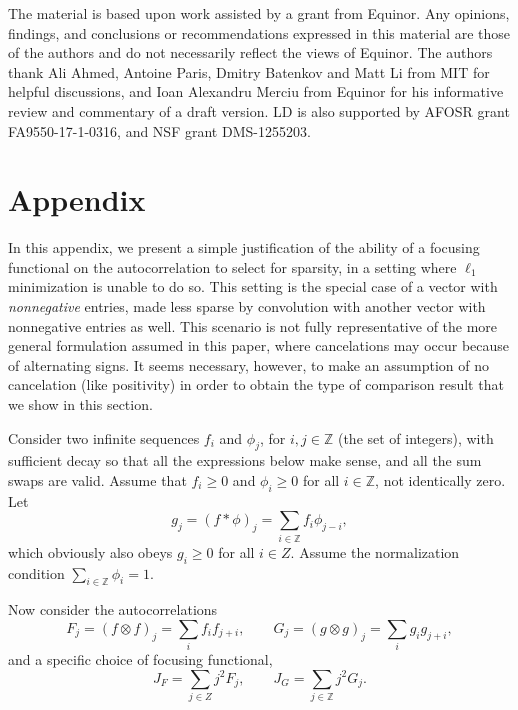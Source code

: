 \documentclass{article}
\theoremstyle{definition}
\newcommand{\Z}{\mathbb{Z}}
\begin{document}
{The material is based upon work
assisted by a grant from Equinor. 
Any opinions, findings, and conclusions or recommendations
expressed in this material 
are those of the authors
and do not necessarily 
reflect the views of Equinor.
%
The authors thank 
Ali Ahmed, Antoine Paris, Dmitry Batenkov and Matt Li from MIT for helpful discussions, and Ioan Alexandru Merciu
from Equinor for
his informative review and commentary of a draft version. 
LD is also supported by AFOSR grant FA9550-17-1-0316, and NSF grant DMS-1255203.


\onecolumn



\appendix
\section{Appendix}

In this %
appendix, 
we present a simple justification of the ability of a focusing functional on the autocorrelation to select for sparsity, in a setting where $\ell_1$ minimization is unable to do so. This setting is the special case of a vector with \emph{nonnegative} entries, made less sparse by convolution with another vector with nonnegative entries as well. This scenario is not fully representative of the more general formulation assumed in this paper, where cancelations may occur because of alternating signs. It seems necessary, however, to make an assumption of no cancelation (like positivity) in order to obtain the type of comparison result that we show in this section. 

Consider two infinite sequences $f_i$ and $\phi_j$, for $i, j \in \Z$ (the set of integers), with sufficient decay so that all the expressions below make sense, and all the sum swaps are valid. Assume that $f_i \geq 0$ and $\phi_i \geq 0$ for all $i \in \Z$, not identically zero. Let
\[
g_j = (f * \phi)_j = \sum_{i \in \Z} f_i \phi_{j-i},
\]
which obviously also obeys $g_i \geq 0$ for all $i \in Z$. Assume the normalization condition $\sum_{i \in \Z} \phi_i = 1$.

Now consider the autocorrelations
\[
F_j = (f \otimes f)_j = \sum_i f_i f_{j+i}, \qquad G_j = (g \otimes g)_j = \sum_i g_i g_{j+i},
\]
and a specific choice of focusing functional,
\[
J_F = \sum_{j \in Z} j^2 F_j, \qquad J_G = \sum_{j\in \Z} j^2 G_j.
\]

}
\end{document}

